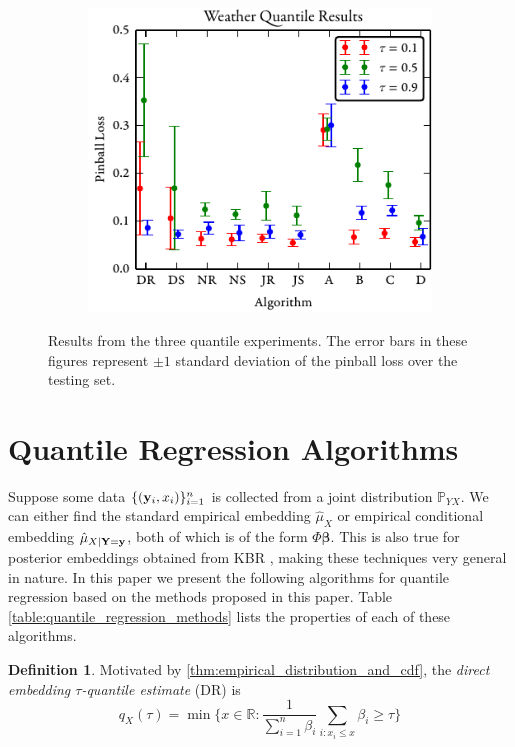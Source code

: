 \documentclass[twoside]{article} \usepackage{aistats2017}
\theoremstyle{definition}
\newtheorem{definition}{Definition}[section]
\theoremstyle{theorem}
\newcommand{\rv}[1]{{#1}}
\begin{document}
\begin{figure}[t]
		\begin{subfigure}[b]{0.32\textwidth}
			\includegraphics[width=\textwidth]{figures/Weather_results}
		\end{subfigure}
		\caption{Results from the three quantile experiments. The error bars in these figures represent $\pm 1$ standard deviation of the pinball loss over the testing set.}
		\label{fig:qfull}
	\end{figure}

\section{Quantile Regression Algorithms}
\label{sec:quantile_regression_algorithms}
	
	Suppose some data $\{(\mathbf{y}_{i}, x_{i})\}_{i = 1}^{n}$ is collected from a joint distribution $\mathbb{P}_{\rv{Y} \rv{X}}$. We can either find the standard empirical embedding $\hat{\mu}_{\rv{X}}$ or empirical conditional embedding $\hat{\mu}_{\rv{X} | \bvec{\rv{Y}} = \bvec{y}}$, both of which is of the form $\Phi \bm{\beta}$. This is also true for posterior embeddings obtained from KBR \citep{fukumizu2013kernel}, making these techniques very general in nature. In this paper we present the following algorithms for quantile regression based on the methods proposed in this paper. Table \ref{table:quantile_regression_methods} lists the properties of each of these algorithms.

	\theoremstyle{definition}
	\begin{definition}
		Motivated by \cref{thm:empirical_distribution_and_cdf}, the \textit{direct embedding $\tau$-quantile estimate} (DR) is
		\begin{equation}
		q_{\rv{X}}(\tau) = \min\{x \in \mathbb{R} : \frac{1}{\sum_{i = 1}^{n} \beta_{i}} \sum_{i : x_{i} \leq x} \beta_{i} \geq \tau\}
		\end{equation}	
	\end{definition}
	
\end{document}
